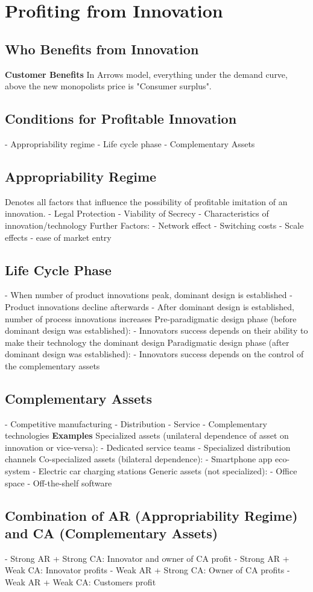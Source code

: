 \documentclass{scrartcl}
\begin{document}
\section*{Profiting from Innovation}
\subsection*{Who Benefits from Innovation}
\textbf{Customer Benefits}
In Arrows model, everything under the demand curve, above the new monopolists price is "Consumer surplus".
\subsection*{Conditions for Profitable Innovation}
- Appropriability regime
- Life cycle phase
- Complementary Assets
\subsection*{Appropriability Regime}
Denotes all factors that influence the possibility of profitable imitation of an innovation.
- Legal Protection
- Viability of Secrecy
- Characteristics of innovation/technology
Further Factors:
- Network effect
- Switching costs
- Scale effects
- ease of market entry
\subsection*{Life Cycle Phase}
- When number of product innovations peak, dominant design is established
- Product innovations decline afterwards
- After dominant design is established, number of process innovations increases
Pre-paradigmatic design phase (before dominant design was established):
- Innovators success depends on their ability to make their technology the dominant design
Paradigmatic design phase (after dominant design was established):
- Innovators success depends on the control of the complementary assets
\subsection*{Complementary Assets}
- Competitive manufacturing
- Distribution
- Service
- Complementary technologies
\textbf{Examples}
Specialized assets (unilateral dependence of asset on innovation or vice-versa):
- Dedicated service teams
- Specialized distribution channels
Co-specialized assets (bilateral dependence):
- Smartphone app eco-system
- Electric car charging stations
Generic assets (not specialized):
- Office space
- Off-the-shelf software
\subsection*{Combination of AR (Appropriability Regime) and CA (Complementary Assets)}
- Strong AR + Strong CA: Innovator and owner of CA profit
- Strong AR + Weak CA: Innovator profits
- Weak AR + Strong CA: Owner of CA profits
- Weak AR + Weak CA: Customers profit
\end{document}

